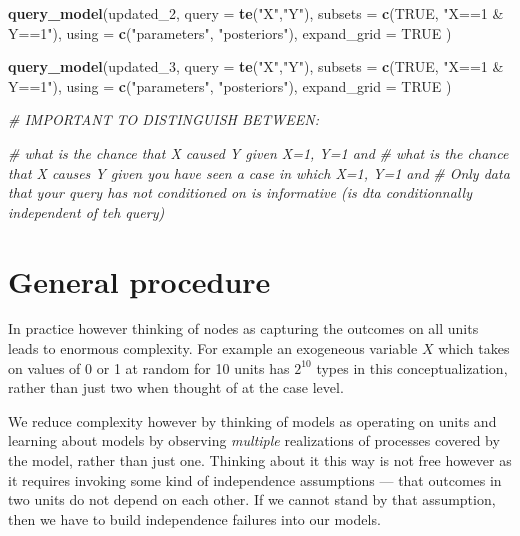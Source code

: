 \documentclass[12pt,]{book}
\newenvironment{Shaded}{\begin{snugshade}}{\end{snugshade}}
\newcommand{\CommentTok}[1]{\textcolor[rgb]{0.56,0.35,0.01}{\textit{#1}}}
\newcommand{\DataTypeTok}[1]{\textcolor[rgb]{0.13,0.29,0.53}{#1}}
\newcommand{\DecValTok}[1]{\textcolor[rgb]{0.00,0.00,0.81}{#1}}
\newcommand{\KeywordTok}[1]{\textcolor[rgb]{0.13,0.29,0.53}{\textbf{#1}}}
\newcommand{\NormalTok}[1]{#1}
\newcommand{\OtherTok}[1]{\textcolor[rgb]{0.56,0.35,0.01}{#1}}
\newcommand{\StringTok}[1]{\textcolor[rgb]{0.31,0.60,0.02}{#1}}
\begin{document}
\begin{Shaded}
\begin{Highlighting}[]
\KeywordTok{query_model}\NormalTok{(updated_}\DecValTok{2}\NormalTok{, }
                        \DataTypeTok{query =} \KeywordTok{te}\NormalTok{(}\StringTok{"X"}\NormalTok{,}\StringTok{"Y"}\NormalTok{), }
                        \DataTypeTok{subsets =} \KeywordTok{c}\NormalTok{(}\OtherTok{TRUE}\NormalTok{, }\StringTok{"X==1 & Y==1"}\NormalTok{), }
                        \DataTypeTok{using =} \KeywordTok{c}\NormalTok{(}\StringTok{"parameters"}\NormalTok{, }\StringTok{"posteriors"}\NormalTok{), }
                        \DataTypeTok{expand_grid =} \OtherTok{TRUE}\NormalTok{ )}

\KeywordTok{query_model}\NormalTok{(updated_}\DecValTok{3}\NormalTok{, }
                        \DataTypeTok{query =} \KeywordTok{te}\NormalTok{(}\StringTok{"X"}\NormalTok{,}\StringTok{"Y"}\NormalTok{), }
                        \DataTypeTok{subsets =} \KeywordTok{c}\NormalTok{(}\OtherTok{TRUE}\NormalTok{, }\StringTok{"X==1 & Y==1"}\NormalTok{), }
                        \DataTypeTok{using =} \KeywordTok{c}\NormalTok{(}\StringTok{"parameters"}\NormalTok{, }\StringTok{"posteriors"}\NormalTok{), }
                        \DataTypeTok{expand_grid =} \OtherTok{TRUE}\NormalTok{ )}


\CommentTok{# IMPORTANT TO DISTINGUISH BETWEEN:}

\CommentTok{# what is the chance that X caused Y given X=1, Y=1 and}
\CommentTok{# what is the chance that X causes Y given you have seen a case in which X=1, Y=1 and}
\CommentTok{# Only data that your query has not conditioned on is informative (is dta conditionnally independent of teh query)}
\end{Highlighting}
\end{Shaded}

\hypertarget{general-procedure}{%
\section{General procedure}\label{general-procedure}}

In practice however thinking of nodes as capturing the outcomes on all units leads to enormous complexity. For example an exogeneous variable \(X\) which takes on values of 0 or 1 at random for 10 units has \(2^{10}\) types in this conceptualization, rather than just two when thought of at the case level.

We reduce complexity however by thinking of models as operating on units and learning about models by observing \emph{multiple} realizations of processes covered by the model, rather than just one. Thinking about it this way is not free however as it requires invoking some kind of independence assumptions --- that outcomes in two units do not depend on each other. If we cannot stand by that assumption, then we have to build independence failures into our models.
\end{document}

